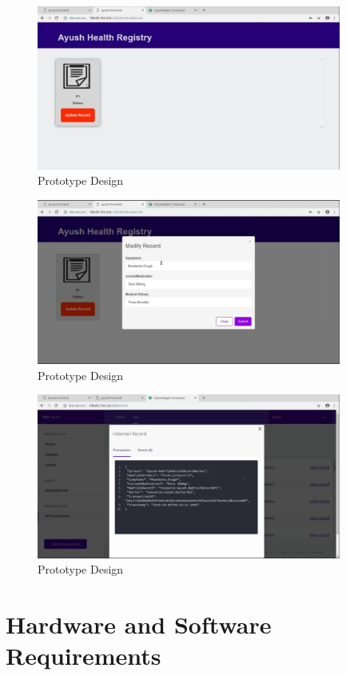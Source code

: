 \documentclass[11pt]{report}
\begin{document}
    \begin{figure}
        \centering
        \includegraphics[scale=0.3,width=10cm]{Proto4.png}
        \caption{Prototype Design}
        \label{fig:my_label}
    \end{figure}
    \begin{figure}
        \centering
        \includegraphics[scale=0.3,width=10cm]{Proto5.png}
        \caption{Prototype Design}
        \label{fig:my_label}
    \end{figure}
    \begin{figure}
        \centering
        \includegraphics[scale=0.3,width=10cm]{Proto6.png}
        \caption{Prototype Design}
        \label{fig:my_label}
    \end{figure}
\chapter{Hardware and Software Requirements}
\end{document}
